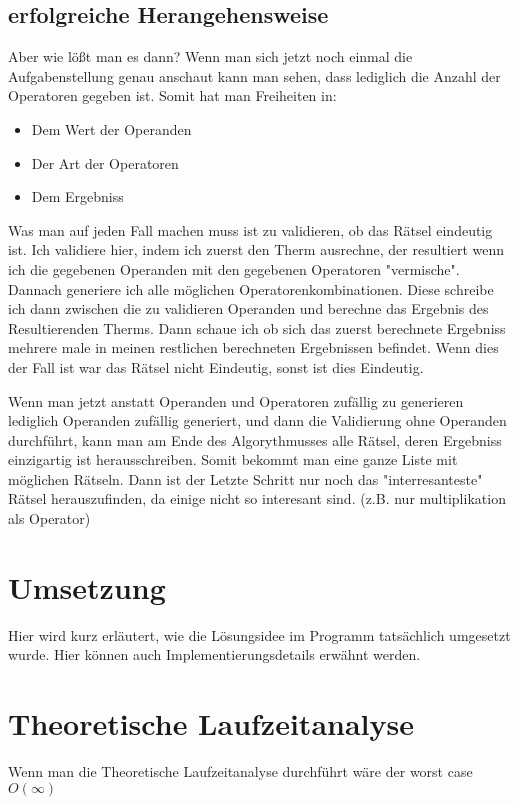 \documentclass[a4paper,10pt,ngerman]{scrartcl}
\begin{document}
\subsection{erfolgreiche Herangehensweise}

Aber wie lößt man es dann?
\newline
Wenn man sich jetzt noch einmal die Aufgabenstellung genau anschaut kann man sehen, dass lediglich die Anzahl der Operatoren gegeben ist. Somit hat man Freiheiten in:
\begin{itemize}
\item Dem Wert der Operanden
\item Der Art der Operatoren
\item Dem Ergebniss
\end{itemize}
Was man auf jeden Fall machen muss ist zu validieren, ob das Rätsel eindeutig ist. Ich validiere hier, indem ich zuerst den Therm ausrechne, der resultiert wenn ich die gegebenen Operanden mit den gegebenen Operatoren "vermische". Dannach generiere ich alle möglichen Operatorenkombinationen. Diese schreibe ich dann zwischen die zu validieren Operanden und berechne das Ergebnis des Resultierenden Therms. Dann schaue ich ob sich das zuerst berechnete Ergebniss mehrere male in meinen restlichen berechneten Ergebnissen befindet. Wenn dies der Fall ist war das Rätsel nicht Eindeutig, sonst ist dies Eindeutig.

Wenn man jetzt anstatt Operanden und Operatoren zufällig zu generieren lediglich Operanden zufällig generiert, und dann die Validierung ohne Operanden durchführt, kann man am Ende des Algorythmusses alle Rätsel, deren Ergebniss einzigartig ist herausschreiben. Somit bekommt man eine ganze Liste mit möglichen Rätseln. Dann ist der Letzte Schritt nur noch das "interresanteste" Rätsel herauszufinden, da einige nicht so interesant sind. (z.B. nur multiplikation als Operator)

\section{Umsetzung}
Hier wird kurz erläutert, wie die Lösungsidee im Programm tatsächlich umgesetzt wurde. Hier können auch Implementierungsdetails erwähnt werden.

\section{Theoretische Laufzeitanalyse}

Wenn man die Theoretische Laufzeitanalyse durchführt wäre der worst case $O(\infty)$
\end{document}
